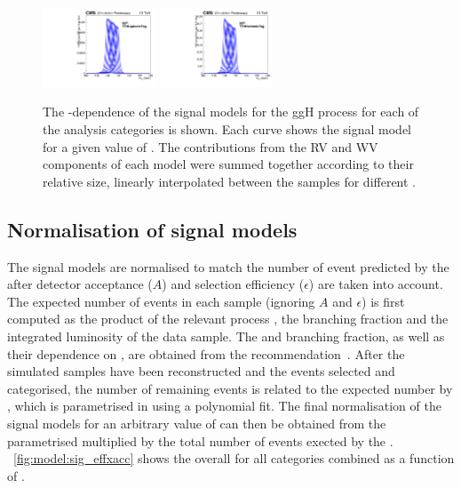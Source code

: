 \begin{figure}[ht!]
\includegraphics[width=0.3\textwidth]{modellingFigures/DCBpG/ggh_TTHLeptonicTag_fmc_interp.pdf} 
\includegraphics[width=0.3\textwidth]{modellingFigures/DCBpG/ggh_TTHHadronicTag_fmc_interp.pdf} 
\caption{The \mH-dependence of the signal models for the ggH process for each of the analysis categories is shown. Each curve shows the signal model for a given value of \mH. The contributions from the RV and WV components of each model were summed together according to their relative size, linearly interpolated between the samples for different \mH.}

\label{fig:model:sig_interpolation}
\end{figure}

\subsection{Normalisation of signal models}

The signal models are normalised to match the number of event predicted by the \SM after detector acceptance ($A$) and selection efficiency ($\epsilon$) are taken into account. The expected number of events in each sample (ignoring $A$ and $\epsilon$) is first computed as the product of the relevant process \crosssection, the \Hgg branching fraction and the integrated luminosity of the data sample. The \crosssection\s and branching fraction, as well as their dependence on \mH, are obtained from the \LHCHXSWG recommendation~\cite{LHCHXSWGYR4}. After the simulated samples have been reconstructed and the events selected and categorised, the number of remaining events is related to the expected number by \effxacc, which is parametrised in \mH using a polynomial fit. The final normalisation of the signal models for an arbitrary value of \mH can then be obtained from the parametrised \effxacc multiplied by the total number of events exected by the \SM. \Fig~\ref{fig:model:sig_effxacc} shows the overall \effxacc for all categories combined as a function of \mH.

